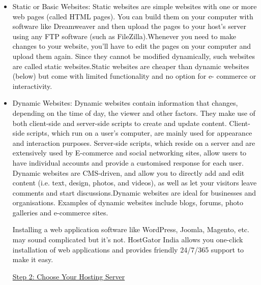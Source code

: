 \documentclass[12pt]{report}
\renewcommand{\_}{\kern-1.5pt\textunderscore\kern-1.5pt}
\begin{document}
\begin{itemize}
	\item {\fontsize{13pt}{15.6pt}\selectfont \textcolor[HTML]{0D0D0D}{Static or Basic Websites: Static websites are simple websites with one or more web pages (called HTML pages). You can build them on your computer with software like Dreamweaver and then upload the pages to your host’s server using any FTP software (such as FileZilla).Whenever you need to make changes to your website, you’ll have to edit the pages on your computer and upload them again. Since they cannot be modified dynamically, such websites are called static websites.Static websites are cheaper than dynamic websites (below) but come with limited functionality and no option for e- commerce or interactivity.}\par}\par

	\item {\fontsize{13pt}{15.6pt}\selectfont \textcolor[HTML]{0D0D0D}{Dynamic Websites: Dynamic websites contain information that changes, depending on the time of day, the viewer and other factors. They make use of both client-side and server-side scripts to create and update content. Client- side scripts, which run on a user’s computer, are mainly used for appearance and interaction purposes. Server-side scripts, which reside on a server and are extensively used by E-commerce and social networking sites, allow users to have individual accounts and provide a customised response for each user. Dynamic websites are CMS-driven, and allow you to directly add and edit content (i.e. text, design, photos, and videos), as well as let your visitors leave comments and start discussions.Dynamic websites are ideal for businesses and organisations. Examples of dynamic websites include blogs, forums, photo galleries and e-commerce sites.}\par}\par


\vspace{\baselineskip} \tabto{0.59in} \textcolor[HTML]{0D0D0D}{Installing a web application software like WordPress, Joomla, Magento, etc. may sound complicated but it’s not. HostGator India allows you one-click installation of web applications and provides friendly 24/7/365 support to make it easy.}\par


\vspace{\baselineskip}\textcolor[HTML]{0D0D0D}{\uline{Step 2: Choose Your Hosting Server}}\par


\end{itemize}
\end{document}
